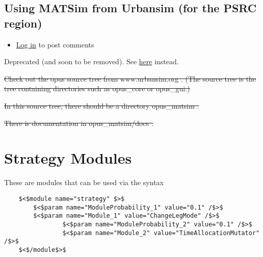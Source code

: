 \documentclass[a4paper,11pt]{report}
\begin{document}
\vfill\eject
\section{Using MATSim from Urbansim (for the PSRC region)}
\begin{itemize}
	\item \href{http://www.matsim.org/user/login?destination=comment/reply/309%23comment-form}{Log in} to post comments
\end{itemize}

Deprecated (and soon to be removed). See \href{http://matsim.org/extensions/matsim4urbansim}{here} instead.



\sout{Check  out the opus source tree from www.urbansim.org . (The source tree  is the tree containing directories such as opus\_core or opus\_gui.)}

\sout{In this source tree, there should be a directory opus\_matsim .}

\sout{There is documentation in opus\_matsim/docs .}


\chapter{Strategy Modules}




These are modules that can be used via the syntax
\begin{verbatim}
	$<$module name="strategy" $>$
		$<$param name="ModuleProbability_1" value="0.1" /$>$
		$<$param name="Module_1" value="ChangeLegMode" /$>$
                $<$param name="ModuleProbability_2" value="0.1" /$>$
                $<$param name="Module_2" value="TimeAllocationMutator" /$>$
	$<$/module$>$
\end{verbatim}
\end{document}
